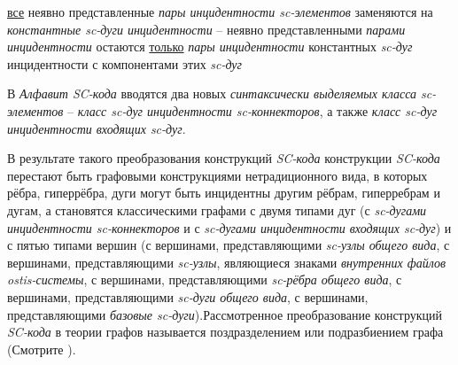 \begin{SCn}
\begin{scnstruct}
\begin{scnsubstruct}
{                \begin{scnitemize}
                    \item{\uline{все} неявно представленные \textit{пары инцидентности sc-элементов} заменяются на \textit{константные sc-дуги инцидентности} -- неявно представленными \textit{парами инцидентности} остаются \uline{только} \textit{пары инцидентности} константных \textit{sc-дуг} инцидентности с компонентами этих \textit{sc-дуг}}
                    \item{В \textit{Алфавит SC-кода} вводятся два новых \textit{синтаксически выделяемых класса sc-элементов} -- \textit{класс sc-дуг инцидентности sc-коннекторов}, а также \textit{класс sc-дуг инцидентности входящих sc-дуг}.}
                \end{scnitemize}
                В результате такого преобразования конструкций \textit{SC-кода} конструкции \textit{SC-кода} перестают быть графовыми конструкциями нетрадиционного вида, в которых рёбра, гиперрёбра, дуги могут быть инцидентны другим рёбрам, гиперребрам и дугам, а становятся классическими графами с двумя типами дуг (с \textit{sc-дугами инцидентности sc-коннекторов} и с \textit{sc-дугами инцидентности входящих sc-дуг}) и с пятью типами вершин (с вершинами, представляющими \textit{sc-узлы общего вида}, с вершинами, представляющими \textit{sc-узлы}, являющиеся знаками \textit{внутренних файлов ostis-системы}, с вершинами, представляющими \textit{sc-рёбра общего вида}, с вершинами, представляющими \textit{sc-дуги общего вида}, с вершинами, представляющими \textit{базовые sc-дуги}).Рассмотренное преобразование конструкций \textit{SC-кода} в теории графов называется поздразделением или подразбиением графа (Смотрите \cite{Trudeau1993}).}
            \end{scnsubstruct}
            \scnendsegmentcomment
            \bigskip
        \end{scnstruct}
    \scnendcurrentsectioncomment
    
    \end{SCn}
    \label{sd_sc_code_syntax}\label{sd_sc_code_semantic}